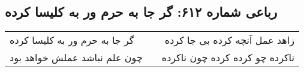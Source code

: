 \begin{center}
\section*{رباعی شماره ۶۱۲: گر جا به حرم ور به کلیسا کرده}
\label{sec:sh612}
\begin{longtable}{l p{0.5cm} r}
گر جا به حرم ور به کلیسا کرده
&&
زاهد عمل آنچه کرده بی جا کرده
\\
چون علم نباشد عملش خواهد بود
&&
ناکرده چو کرده کرده چون ناکرده
\\
\end{longtable}
\end{center}
